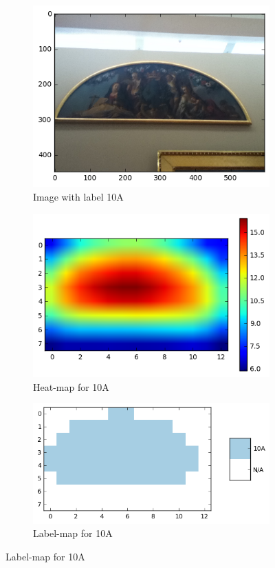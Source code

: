 \begin{figure}
\centering
\begin{subfigure}[b]{0.3\textwidth}
\includegraphics[width=\textwidth]{img/sample1_10A-0519.png}
\caption{Image with label 10A\label{fig:sample1_id}}
\end{subfigure}
\begin{subfigure}[b]{0.3\textwidth}
\includegraphics[width=\textwidth]{img/sample1_heatmap.png}
\caption{Heat-map for 10A\label{fig:sample1_hm}}
\end{subfigure}
\begin{subfigure}[b]{0.3\textwidth}
\includegraphics[width=\textwidth]{img/sample1_labels.png}
\caption{Label-map for 10A\label{fig:sample1_lab}}
\end{subfigure}


\end{figure}
